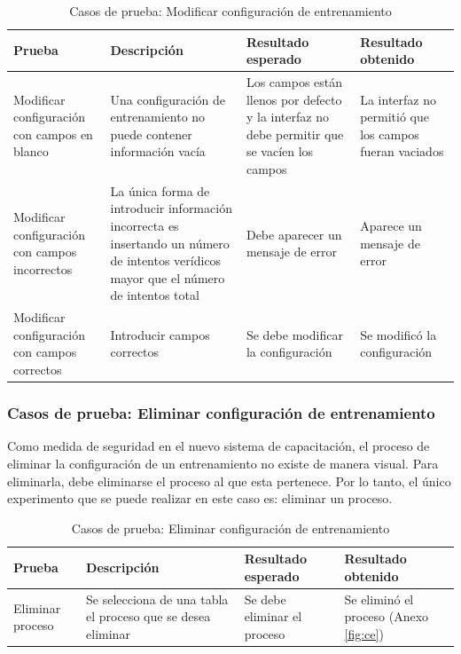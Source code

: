 \begin{table}[H]
\begin{center}
\begin{tabular}{ | p{4cm} | p{4cm} | p{3.1cm} | p{3cm} |}
\hline
\centering\textbf{Prueba} & \textbf{Descripción} & \textbf{Resultado \break esperado} & \textbf{Resultado \break obtenido} \\
\hline
Modificar configuración con campos en blanco & Una configuración de entrenamiento no puede contener información vacía & Los campos están llenos por defecto y la interfaz no debe permitir que se vacíen los campos & La interfaz no permitió que los campos fueran vaciados \\
\hline
Modificar configuración con campos incorrectos & La única forma de introducir información incorrecta es insertando un número de intentos verídicos mayor que el número de intentos total & Debe aparecer un mensaje de error & Aparece un mensaje de error \\
\hline
Modificar configuración con campos correctos & Introducir campos correctos & Se debe modificar la configuración  & Se modificó la configuración \\
\hline
\end{tabular}
\caption{Casos de prueba: Modificar configuración de entrenamiento}
\label{cas2}
\end{center}
\end{table}

\subsubsection{Casos de prueba: Eliminar configuración de entrenamiento}
Como medida de seguridad en el nuevo sistema de capacitación, el proceso de eliminar la configuración de un entrenamiento no existe de manera visual. Para eliminarla, debe eliminarse el proceso al que esta pertenece. Por lo tanto, el único experimento que se puede realizar en este caso es: eliminar un proceso.

\begin{table}[H]
\begin{center}
\begin{tabular}{ | p{2.7cm} | p{5.2cm} | p{3.1cm} | p{3.2cm} |}
\hline
\centering\textbf{Prueba} & \textbf{Descripción} & \textbf{Resultado \break esperado} & \textbf{Resultado \break obtenido} \\
\hline
Eliminar proceso & Se selecciona de una tabla el proceso que se desea eliminar & Se debe eliminar el proceso & Se eliminó el proceso (Anexo \ref{fig:ce}) \\
\hline
\end{tabular}
\caption{Casos de prueba: Eliminar configuración de entrenamiento}
\label{cas3}
\end{center}
\end{table}


